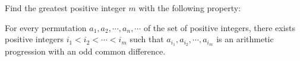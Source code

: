 Find the greatest positive integer $m$ with the following property:

For every permutation $a_1, a_2, \cdots, a_n,\cdots$ of the set of positive integers, there exists positive integers $i_1<i_2<\cdots <i_m$ such that $a_{i_1}, a_{i_2}, \cdots, a_{i_m}$ is an arithmetic progression with an odd common difference.